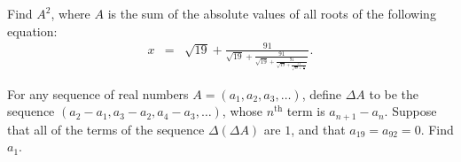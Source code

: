 \documentclass[11pt]{article}
\theoremstyle{definition}
\begin{document}
\begin{question}[name={1991 AIME, \href{https://artofproblemsolving.com/community/c4p410088}{Problem 7}}]
	Find $A^2$, where $A$ is the sum of the absolute values of all roots of the following equation:
	\begin{eqnarray*}
		x &=& \sqrt{19} + \frac{91}{{\displaystyle \sqrt{19}+\frac{91}{{\displaystyle \sqrt{19}+\frac{91}{{\displaystyle \sqrt{19}+\frac{91}{{\displaystyle \sqrt{19}+\frac{91}{x}}}}}}}}}.
	\end{eqnarray*}
\end{question}
%
%
%	












\begin{question}[name={1992 AIME, \href{https://artofproblemsolving.com/community/c4p430070}{Problem 8}}]
	For any sequence of real numbers $A=(a_1,a_2,a_3,\ldots)$, define $\Delta A$ to be the sequence $(a_2-a_1,a_3-a_2,a_4-a_3,\ldots)$, whose $n^\text{th}$ term is $a_{n+1}-a_n$. Suppose that all of the terms of the sequence $\Delta(\Delta A)$ are $1$, and that $a_{19}=a_{92}=0$. Find $a_1$.
\end{question}
\end{document}
